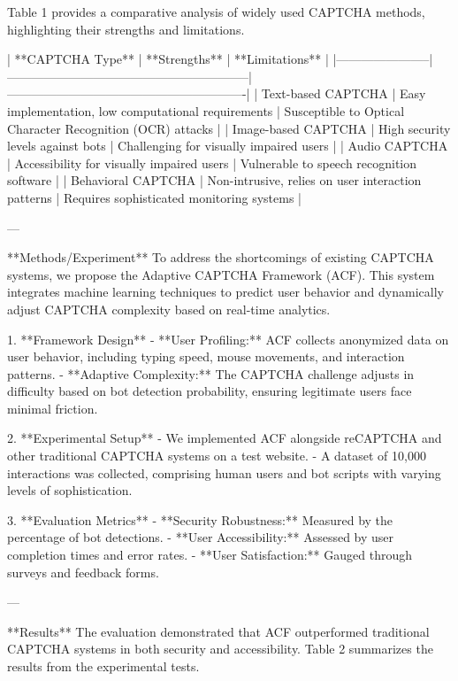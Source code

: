 Table 1 provides a comparative analysis of widely used CAPTCHA methods, highlighting their strengths and limitations.  

| **CAPTCHA Type**     | **Strengths**                                              | **Limitations**                                           |  
|-----------------------|-----------------------------------------------------------|----------------------------------------------------------|  
| Text-based CAPTCHA    | Easy implementation, low computational requirements       | Susceptible to Optical Character Recognition (OCR) attacks |  
| Image-based CAPTCHA   | High security levels against bots                         | Challenging for visually impaired users                  |  
| Audio CAPTCHA         | Accessibility for visually impaired users                 | Vulnerable to speech recognition software                |  
| Behavioral CAPTCHA    | Non-intrusive, relies on user interaction patterns        | Requires sophisticated monitoring systems                |  

---

**Methods/Experiment**  
To address the shortcomings of existing CAPTCHA systems, we propose the Adaptive CAPTCHA Framework (ACF). This system integrates machine learning techniques to predict user behavior and dynamically adjust CAPTCHA complexity based on real-time analytics.  

1. **Framework Design**  
   - **User Profiling:** ACF collects anonymized data on user behavior, including typing speed, mouse movements, and interaction patterns.  
   - **Adaptive Complexity:** The CAPTCHA challenge adjusts in difficulty based on bot detection probability, ensuring legitimate users face minimal friction.  

2. **Experimental Setup**  
   - We implemented ACF alongside reCAPTCHA and other traditional CAPTCHA systems on a test website.  
   - A dataset of 10,000 interactions was collected, comprising human users and bot scripts with varying levels of sophistication.  

3. **Evaluation Metrics**  
   - **Security Robustness:** Measured by the percentage of bot detections.  
   - **User Accessibility:** Assessed by user completion times and error rates.  
   - **User Satisfaction:** Gauged through surveys and feedback forms.  

---

**Results**  
The evaluation demonstrated that ACF outperformed traditional CAPTCHA systems in both security and accessibility. Table 2 summarizes the results from the experimental tests.  

